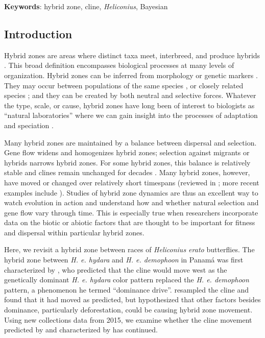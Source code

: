 \documentclass[]{article}
\begin{document}
\textbf{Keywords}: hybrid zone, cline, \textit{Heliconius}, Bayesian

\subsection{Introduction}\label{introduction}

Hybrid zones are areas where distinct taxa meet, interbreed, and produce
hybrids \citep{Barton:1985vd}. This broad definition encompasses
biological processes at many levels of organization. Hybrid zones can be
inferred from morphology \citep[e.g.,][]{Delahaie:2017hv} or genetic
markers \citep[e.g.,][]{Porter:1997ia}. They may occur between
populations of the same species \citep[e.g.,][]{Wilson:2016kf}, or
closely related species \citep[e.g.,][]{Miller:2014fz}; and they can be
created by both neutral and selective forces. Whatever the type, scale,
or cause, hybrid zones have long been of interest to biologists as
``natural laboratories'' where we can gain insight into the processes of
adaptation and speciation
\citep{Haldane:1948un, Harrison:1990tn, Buggs:2007ba, Gompert:2017fl}.

Many hybrid zones are maintained by a balance between dispersal and
selection. Gene flow widens and homogenizes hybrid zones; selection
against migrants or hybrids narrows hybrid zones. For some hybrid zones,
this balance is relatively stable and clines remain unchanged for
decades \citep[e.g.,][]{Mettler:2009jm, Rosser:2014bg}. Many hybrid
zones, however, have moved or changed over relatively short timespans
(reviewed in \citealp{Buggs:2007ba}; more recent examples include
\citealp{Roy:2012kx,Leache:2017bx,Hunter:2017hy}). Studies of hybrid
zone dynamics are thus an excellent way to watch evolution in action and
understand how and whether natural selection and gene flow vary through
time. This is especially true when researchers incorporate data on the
biotic or abiotic factors that are thought to be important for fitness
and dispersal within particular hybrid zones.

Here, we revisit a hybrid zone between races of
\textit{Heliconius erato} butterflies. The hybrid zone between
\textit{H. e. hydara} and \textit{H. e. demophoon} in Panamá was first
characterized by \citet{Mallet:1986vj}, who predicted that the cline
would move west as the genetically dominant \textit{H. e. hydara} color
pattern replaced the \textit{H. e. demophoon} pattern, a phenomenon he
termed ``dominance drive''. \citet{Blum:2002wr} resampled the cline and
found that it had moved as predicted, but hypothesized that other
factors besides dominance, particularly deforestation, could be causing
hybrid zone movement. Using new collections data from 2015, we examine
whether the cline movement predicted by \citet{Mallet:1986vj} and
characterized by \citet{Blum:2002wr} has continued.
\end{document}
